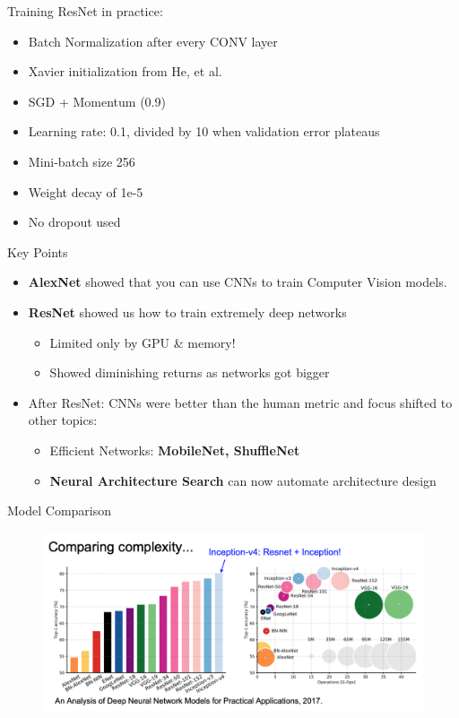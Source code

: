 \documentclass[serif, aspectratio=169]{beamer}
\begin{document}
\begin{frame}{Training ResNet in practice:}
	\begin{itemize}
		\item Batch Normalization after every CONV layer
		\item Xavier initialization from He, et al.
		\item SGD + Momentum (0.9)
		\item Learning rate: 0.1, divided by 10 when validation error plateaus
		\item Mini-batch size 256
		\item Weight decay of 1e-5
		\item No dropout used
	\end{itemize}
\end{frame}

\begin{frame}{Key Points}
	\begin{itemize}
		\item \textbf{AlexNet} showed that you can use CNNs to train Computer Vision models. 
		\item \textbf{ResNet} showed us how to train extremely deep networks
		\begin{itemize}
			\item Limited only by GPU \& memory!
			\item Showed diminishing returns as networks got bigger
		\end{itemize}
		\item After ResNet: CNNs were better than the human metric and focus shifted to other topics:
		\begin{itemize}
			\item Efficient Networks: \textbf{MobileNet, ShuffleNet}
			\item \textbf{Neural Architecture Search} can now automate architecture design
		\end{itemize}
	\end{itemize}
\end{frame}

\begin{frame}{Model Comparison}
	\begin{figure}[htpb]
		\begin{center}
			\includegraphics[keepaspectratio, scale=0.25]{pic/model_comp2}
			\caption*{}
		\end{center}
	\end{figure}
\end{frame}
\end{document}
